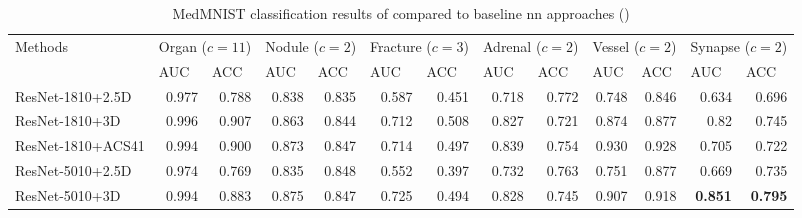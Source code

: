 \documentclass[journal]{IEEEtran}
\begin{document}
\begin{table*}[t!]
\centering
\caption{MedMNIST classification results of compared to baseline \ac{nn} approaches (\cite{medmnist})} \label{tab:medmnist}
\begin{tabular}{|l|rr|rr|rr|rr|rr|rr|}
\hline
\multirow{2}{*}{Methods}                & \multicolumn{2}{c}{Organ ($c=11$)}                  & \multicolumn{2}{c}{Nodule ($c=2$)}                 & \multicolumn{2}{c}{Fracture ($c=3$)}               & \multicolumn{2}{c}{Adrenal ($c=2$)}                & \multicolumn{2}{c}{Vessel ($c=2$)}                 & \multicolumn{2}{c|}{Synapse ($c=2$)}                \\
                         & \multicolumn{1}{l}{AUC} & \multicolumn{1}{l}{ACC} & \multicolumn{1}{l}{AUC} & \multicolumn{1}{l}{ACC} & \multicolumn{1}{l}{AUC} & \multicolumn{1}{l}{ACC} & \multicolumn{1}{l}{AUC} & \multicolumn{1}{l}{ACC} & \multicolumn{1}{l}{AUC} & \multicolumn{1}{l}{ACC} & \multicolumn{1}{l}{AUC} & \multicolumn{1}{l|}{ACC} \\ \hline
ResNet-1810+2.5D        & 0.977                   & 0.788                   & 0.838                   & 0.835                   & 0.587                   & 0.451                   & 0.718                   & 0.772                   & 0.748                   & 0.846                   & 0.634                   & 0.696                   \\
ResNet-1810+3D          & 0.996                   & 0.907                   & 0.863                   & 0.844                   & 0.712                   & 0.508                   & 0.827                   & 0.721                   & 0.874                   & 0.877                   & 0.82                    & 0.745                   \\
ResNet-1810+ACS41       & 0.994                   & 0.900                     & 0.873                   & 0.847                   & 0.714                   & 0.497                   & 0.839                   & 0.754                   & 0.930                    & 0.928                   & 0.705                   & 0.722                   \\
ResNet-5010+2.5D        & 0.974                   & 0.769                   & 0.835                   & 0.848                   & 0.552                   & 0.397                   & 0.732                   & 0.763                   & 0.751                   & 0.877                   & 0.669                   & 0.735                   \\
ResNet-5010+3D          & 0.994                   & 0.883                   & 0.875                   & 0.847                   & 0.725                   & 0.494                   & 0.828                   & 0.745                   & 0.907                   & 0.918                   & \textbf{0.851}          & \textbf{0.795}          \\

\end{tabular}
\end{table*}
\end{document}
